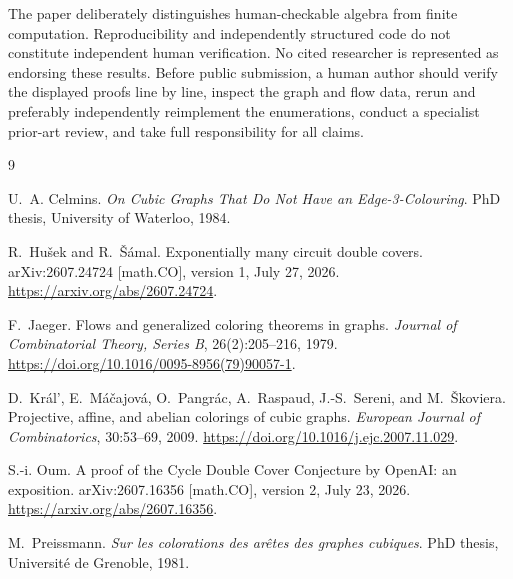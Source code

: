 \documentclass[11pt]{article}
\theoremstyle{definition}
\theoremstyle{remark}
\numberwithin{equation}{section}
\begin{document}
The paper deliberately distinguishes human-checkable algebra from
finite computation.  Reproducibility and independently structured code
do not constitute independent human verification.  No cited researcher
is represented as endorsing these results.  Before public submission, a
human author should verify the displayed proofs line by line, inspect the
graph and flow data, rerun and preferably independently reimplement the
enumerations, conduct a specialist prior-art review, and take full
responsibility for all claims.

\begin{thebibliography}{9}

U.~A. Celmins.
\newblock \emph{On Cubic Graphs That Do Not Have an Edge-3-Colouring}.
\newblock PhD thesis, University of Waterloo, 1984.

R.~Hu\v{s}ek and R.~\v{S}\'amal.
\newblock Exponentially many circuit double covers.
\newblock arXiv:2607.24724 [math.CO], version 1, July 27, 2026.
\newblock \url{https://arxiv.org/abs/2607.24724}.

F.~Jaeger.
\newblock Flows and generalized coloring theorems in graphs.
\newblock \emph{Journal of Combinatorial Theory, Series B},
  26(2):205--216, 1979.
\newblock \url{https://doi.org/10.1016/0095-8956(79)90057-1}.

D.~Kr\'al', E.~M\'a\v{c}ajov\'a, O.~Pangr\'ac, A.~Raspaud,
  J.-S.~Sereni, and M.~\v{S}koviera.
\newblock Projective, affine, and abelian colorings of cubic graphs.
\newblock \emph{European Journal of Combinatorics}, 30:53--69, 2009.
\newblock \url{https://doi.org/10.1016/j.ejc.2007.11.029}.

S.-i. Oum.
\newblock A proof of the Cycle Double Cover Conjecture by OpenAI:
  an exposition.
\newblock arXiv:2607.16356 [math.CO], version 2, July 23, 2026.
\newblock \url{https://arxiv.org/abs/2607.16356}.

M.~Preissmann.
\newblock \emph{Sur les colorations des ar\^etes des graphes cubiques}.
\newblock PhD thesis, Universit\'e de Grenoble, 1981.

\end{thebibliography}
\end{document}
